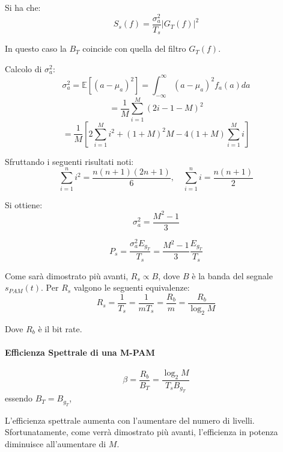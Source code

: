 Si ha che:
\[
    S_s(f) = \frac{\sigma_a^2}{T_s} |G_T(f)|^2
\]

In questo caso la $B_T$ coincide con quella del filtro $G_T(f)$.

Calcolo di $\sigma_a^2$:
\[
    \sigma_a^2 = \mathbb{E} \left[ (a - \mu_a)^2 \right] = \int_{-\infty}^{\infty} (a - \mu_a)^2 f_a(a) da
\]
\[
    = \frac{1}{M} \sum_{i=1}^{M} (2i - 1 - M)^2
\]
\[
    = \frac{1}{M} \left[ 2 \sum_{i=1}^{M} i^2 + (1+M)^2 M - 4(1+M) \sum_{i=1}^{M} i \right]
\]

Sfruttando i seguenti risultati noti:
\[
    \sum_{i=1}^{n} i^2 = \frac{n(n+1)(2n+1)}{6}, \quad \sum_{i=1}^{n} i = \frac{n(n+1)}{2}
\]

Si ottiene:
\[
    \sigma_a^2 = \frac{M^2 - 1}{3}
\]

\[
    P_s = \frac{\sigma_a^2 E_{g_T}}{T_s} = \frac{M^2 - 1}{3} \frac{E_{g_T}}{T_s}
\]


Come sarà dimostrato più avanti, $R_s \propto B$, dove $B$ è la banda del segnale $s_{PAM}(t)$. 
Per $R_s$ valgono le seguenti equivalenze:
\[
    R_s = \frac{1}{T_s} = \frac{1}{mT_s} = \frac{R_b}{m} = \frac{R_b}{\log_2 M}
\]

Dove $R_b$ è il bit rate.




\paragraph*{Efficienza Spettrale di una M-PAM}
\[
    \beta = \frac{R_b}{B_T} = \frac{\log_2 M}{T_s B_{g_T}}
\]
essendo \( B_T = B_{g_T} \),

L'efficienza spettrale aumenta con l'aumentare del numero di livelli. Sfortunatamente, come verrà dimostrato più avanti, l'efficienza in potenza diminuisce all'aumentare di \( M \).

\begin{center}
\end{center}




